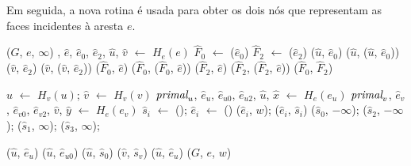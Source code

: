 Em seguida, a nova rotina \LCOLeftFace{} é usada para obter os dois nós que representam as faces incidentes à aresta $e$.


\begin{algorithm}[hbt]
\caption{\MSFdelEdge($G$, $e$)}
\label{Algo:MSFdelEdge}
\begin{algorithmic}[1]
\State \MSFupdate($G$, $e$, $\infty$)\label{Algo:MSFdelEdge:linha:mudaPeso}
\State {}, $\hat e$, $\hat e_0$, $\hat e_2$, $\hat u$, $\hat v$ $\gets$ $H_e(e)$
\State $\hat F_0$ $\gets$ \LCOLeftFace($\hat e_0$)
\State $\hat F_2$ $\gets$ \LCOLeftFace($\hat e_2$)
\State
\State \LCOCycle($\hat u$, $\hat e_0$)
\State \LCOSplit($\hat u$, \LCOPredecessor($\hat u$, $\hat e_0$))
\State \LCOCycle($\hat v$, $\hat e_2$)
\State \LCOSplit($\hat v$, \LCOPredecessor($\hat v$, $\hat e_2$))
\State
\State \LCOCycle($\hat F_0$, $\hat e$)
\State \LCOSplit($\hat F_0$, \LCOPredecessor($\hat F_0$, $\hat e$))
\State \LCOCycle($\hat F_2$, $\hat e$)
\State \LCOSplit($\hat F_2$, \LCOPredecessor($\hat F_2$, $\hat e$))
\State
\State \LCOMerge($\hat F_0$, $\hat F_2$)
\end{algorithmic}
\end{algorithm}

\begin{algorithm}[htb]
\caption{\MSFaddEdge($G$, $e$, $u$, $e_u$, $v$, $e_v$, $w$)}
\label{Algo:MSFaddEdge}
\begin{algorithmic}[1]

\State $\hat u$ $\gets$ $H_v(u)$; $\hat v$ $\gets$ $H_v(v)$
\State $\textit{primal}_u$, $\hat e_u$, $\hat e_{u0}$, $\hat e_{u2}$, $\hat u$, $\hat x$ $\gets$ $H_e(e_u)$
\State $\textit{primal}_v$, $\hat e_v$, $\hat e_{v0}$, $\hat e_{v2}$, $\hat v$, $\hat y$ $\gets$ $H_e(e_v)$
\State $\hat s_i$ $\gets$ \LCOMakeNode(); $\hat e_i$ $\gets$ \LCOMakeNode()
\State  \LCOAddCost($\hat e_i$, $w$);
\State \LCOLink($\hat e_i$, $\hat s_i$)
\EndFor
\State \LCOAddCost($\hat s_0$, $-\infty$); \LCOAddCost($\hat s_2$, $-\infty$);
\State \LCOAddCost($\hat s_1$, $\infty$); \LCOAddCost($\hat s_3$, $\infty$);




\Else
{}
\State \LCOCycle($\hat u$, $\hat e_u$)
\Else
\State \LCOCycle($\hat u$, $\hat e_{u0}$)
\EndIf
\State \LCOMerge($\hat u$, $\hat s_0$)
\State \LCOMerge($\hat v$, $\hat s_v$)
\State \LCOCycle($\hat u$, $\hat e_u$)
\State \MSFupdate($G$, $e$, $w$)
\EndIf
\end{algorithmic}
\end{algorithm}



